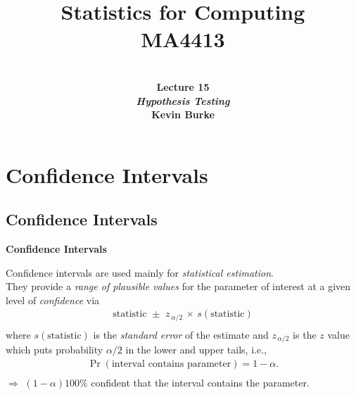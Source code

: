 \documentclass[compress]{beamer}        %
\title{{\huge Statistics for Computing\\[0.1cm]MA4413}}
\author[Kevin Burke]{{\bf\\[0.5cm]{\huge Lecture 15}\\[0.2cm]\emph{Hypothesis Testing}\\[1.4cm]Kevin Burke}\\[0.3cm]\tcb{kevin.burke@ul.ie}}
\institute[University of Limerick, Maths \& Stats Dept]{}
\date{}
\makeatletter
\newcommand{\tcb}{\textcolor{beamer@blendedblue}}
\makeatother
\begin{document}
\begin{frame}[t]
\titlepage
\end{frame}



\section{Confidence Intervals}
\subsection{Confidence Intervals}
\begin{frame}{\bf \tcb{Confidence Intervals}}

Confidence intervals are used mainly for \emph{statistical estimation}.\\[0.7cm]

They provide a \emph{range of plausible values} for the parameter of interest at a given level of \emph{confidence} via \\[-0.2cm]
\begin{align*}
\text{statistic} \,\, \pm \,\, z_{\,\alpha/2} \, \times \, s(\text{statistic})\\[-0.2cm]
\end{align*}
where $s(\text{statistic})$ is the \emph{standard error} of the estimate and $z_{\,\alpha/2}$ is the $z$ value which puts probability $\alpha/2$ in the lower and upper tails, i.e.,\\[-0.2cm]
\begin{align*}
\Pr(\text{interval contains parameter}) = 1 - \alpha.\\[-0.3cm]
\end{align*}
$\Rightarrow$ $(1 - \alpha)100\%$ confident that the interval contains the parameter.

\end{frame}
\end{document}
